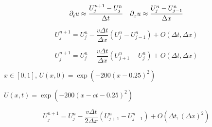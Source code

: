 \begin{equation*}
    \difcp{u}{t}\approx
    \dfrac{U^{n+1}_{j}-U^{n}_{j}}{\Delta t}\quad
    \difcp{u}{x}\approx
    \dfrac{U^{n}_{j}-U^{n}_{j-1}}{\Delta x}
\end{equation*}

\begin{example}
    \begin{equation*}
        U^{n+1}_{j}=
        U^{n}_{j}-
        \dfrac{v\Delta t}{\Delta x}
        \left(U^{n}_{j}-U^{n}_{j-1}\right)+
        O\left(\Delta t,\Delta x\right)
    \end{equation*}
\end{example}

\begin{example}
    \begin{equation*}
        U^{n+1}_{j}=
        U^{n}_{j}-
        \dfrac{v\Delta t}{\Delta x}
        \left(U^{n}_{j+1}-U^{n}_{j}\right)+
        O\left(\Delta t,\Delta x\right)
    \end{equation*}
\end{example}


$x\in\left[0,1\right]$, $U\left(x,0\right)=\exp\left(-200{\left(x-0.25\right)}^{2}\right)$

$U\left(x,t\right)=\exp\left(-200{\left(x-ct-0.25\right)}^{2}\right)$

\begin{example}
    \begin{equation*}
        U^{n+1}_{j}=
        U^{n}_{j}-
        \dfrac{v\Delta t}{2\Delta x}
        \left(U^{n}_{j+1}-U^{n}_{j-1}\right)+
        O\left(\Delta t,{\left(\Delta x\right)}^{2}\right)
    \end{equation*}
\end{example}


